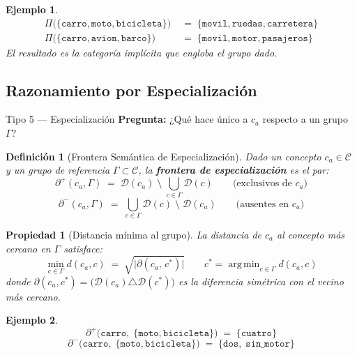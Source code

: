 \documentclass[12pt]{article}
\newtheorem{definition}{Definición}[section]
\newtheorem{property}{Propiedad}[section]
\newtheorem{example}{Ejemplo}[section]
\begin{document}
\begin{example}
	\begin{align*}
		\Pi\!\bigl(\{\texttt{carro},\texttt{moto},\texttt{bicicleta}\}\bigr)
		&\;=\; \{\texttt{movil},\texttt{ruedas},\texttt{carretera}\} \\[4pt]
		\Pi\!\bigl(\{\texttt{carro},\texttt{avion},\texttt{barco}\}\bigr)
		&\;=\; \{\texttt{movil},\texttt{motor},\texttt{pasajeros}\}
	\end{align*}
	El resultado es la categoría implícita que engloba el grupo dado.
\end{example}

\subsection{Razonamiento por Especialización}

\begin{razonbox}{Tipo 5 — Especialización}
	\textbf{Pregunta:} ¿Qué hace único a $c_a$ respecto a un grupo
	$\Gamma$?
\end{razonbox}

\begin{definition}[Frontera Semántica de Especialización]
	Dado un concepto $c_a \in \mathcal{C}$ y un grupo de referencia
	$\Gamma \subset \mathcal{C}$, la \textbf{frontera de especialización} es el
	par:
	\[
	\partial^+(c_a, \Gamma) \;=\;
	\mathcal{D}(c_a) \;\setminus\; \bigcup_{c \in \Gamma} \mathcal{D}(c)
	\qquad \text{(exclusivos de } c_a\text{)}
	\]
	\[
	\partial^-(c_a, \Gamma) \;=\;
	\bigcup_{c \in \Gamma} \mathcal{D}(c) \;\setminus\; \mathcal{D}(c_a)
	\qquad \text{(ausentes en } c_a\text{)}
	\]
\end{definition}

\begin{property}[Distancia mínima al grupo]
	La distancia de $c_a$ al concepto más cercano en $\Gamma$ satisface:
	\[
	\min_{c \in \Gamma} d(c_a, c)
	\;=\; \sqrt{
		\bigl|\partial(c_a,\, c^*)\bigr|}
	\qquad
	c^* = \operatorname{arg\,min}_{c \in \Gamma} d(c_a, c)
	\]
	donde $\partial(c_a, c^*) = \bigl(\mathcal{D}(c_a) \triangle \mathcal{D}(c^*)\bigr)$
	es la diferencia simétrica con el vecino más cercano.
\end{property}

\begin{example}
	\[
	\partial^+\!\bigl(\texttt{carro},\;
	\{\texttt{moto},\texttt{bicicleta}\}\bigr)
	\;=\; \{\texttt{cuatro}\}
	\]
	\[
	\partial^-\!\bigl(\texttt{carro},\;
	\{\texttt{moto},\texttt{bicicleta}\}\bigr)
	\;=\; \{\texttt{dos},\;\texttt{sin\_motor}\}
	\]
\end{example}
\end{document}
